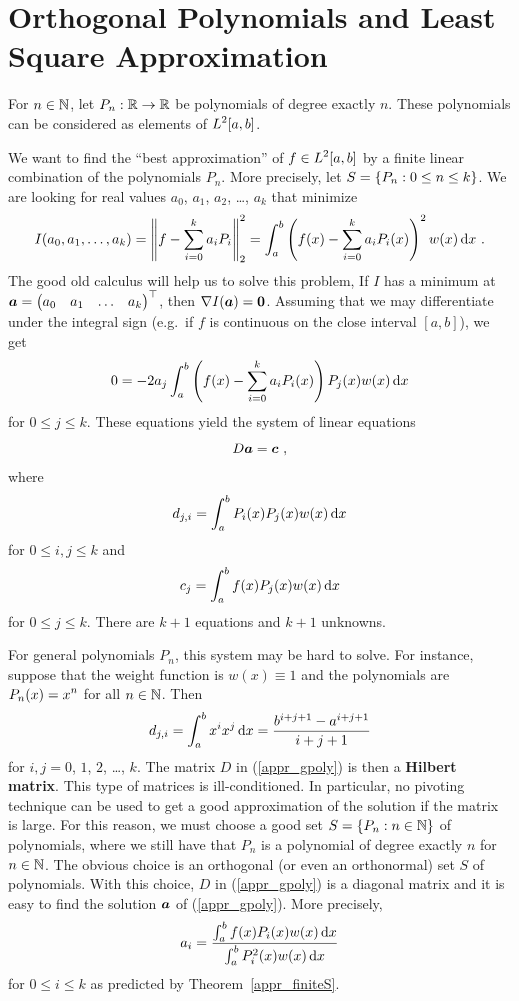 \section{Orthogonal Polynomials and Least Square Approximation} 

For $n\in \mathbb{N}$, let $P_n:\mathbb{R}\rightarrow \mathbb{R}$ be polynomials of degree
exactly $n$.  These polynomials can be considered as elements of
$\displaystyle L^2[a,b]$.

We want to find the ``best approximation'' of
$\displaystyle f\in L^2[a,b]$ by a finite
linear combination of the polynomials $P_n$.  More precisely, let
$\displaystyle S = \{ P_n : 0 \leq n \leq k \}$.  We are looking for 
real values $a_0$, $a_1$, $a_2$, \ldots, $a_k$ that minimize
\[
I(a_0,a_1,\ldots, a_k) = \left\| f - \sum_{i=0}^k a_i P_i \right\|_2^2
= \int_a^b \left( f(x) - \sum_{i=0}^k a_i P_i(x) \right)^2 w(x)\,\mathrm{d}x \  .
\]
The good old calculus will help us to solve this problem,  If $I$ has a
minimum at
$\displaystyle \bm{a} = \begin{pmatrix}
a_0 & a_1 & \ldots & a_k \end{pmatrix}^\top$,
then $\nabla I (\bm{a}) = \bm{0}$.  Assuming that we may differentiate
under the integral sign (e.g.\ if $f$ is continuous on the close interval
$[a,b]$), we get
\[
0 = -2 a_j \int_a^b \left( f(x) - \sum_{i=0}^k a_i P_i(x) \right) P_j(x)
w(x)\,\mathrm{d}x
\]
for $0 \leq j \leq k$.  These equations yield the system of
linear equations
\begin{equation} \label{appr_gpoly}
D \bm{a} = \bm{c} \ ,
\end{equation}
where
\[
  d_{j,i} = \int_a^b P_i(x) P_j(x) w(x) \,\mathrm{d}x
\]
for $0 \leq i,j \leq k$ and
\[
  c_j = \int_a^b f(x) P_j(x) w(x) \,\mathrm{d}x
\]
for $0 \leq j \leq k$.  There are $k+1$ equations and
$k+1$ unknowns.

For general polynomials $P_n$, this system may be hard to solve.  For
instance, suppose that the weight function is $w(x) \equiv 1$ and the
polynomials are $\displaystyle P_n(x) = x^n$ for all $n\in \mathbb{N}$.  Then
\[
d_{j,i} = \int_a^b x^i x^j \,\mathrm{d}x = \frac{b^{i+j+1} - a^{i+j+1}}{i+j+1}
\]
for $i,j = 0$, $1$, $2$, \ldots, $k$.
The matrix $D$ in (\ref{appr_gpoly}) is then a
{\bfseries Hilbert matrix}.
This type of matrices is ill-conditioned.  In particular, no pivoting
technique can be used to get a good approximation of the solution if the
matrix is large.  For this reason, we must choose a good set
$\displaystyle S = \{ P_n :n \in \mathbb{N} \}$ of polynomials, where
we still have that $P_n$ is a polynomial of degree exactly $n$ for $n\in\mathbb{N}$.
The obvious choice is an orthogonal (or even an orthonormal) set $S$ of
polynomials.  With this choice, $D$ in (\ref{appr_gpoly}) is a diagonal
matrix and it is easy to find the solution $\bm{a}$ of
(\ref{appr_gpoly}). More precisely,
\[
a_i = \frac{\int_a^b f(x) P_i(x) w(x) \,\mathrm{d}x}{\int_a^b P_i^2(x) w(x) \,\mathrm{d}x}
\]
for $0 \leq i \leq k$ as predicted by Theorem~\ref{appr_finiteS}.


